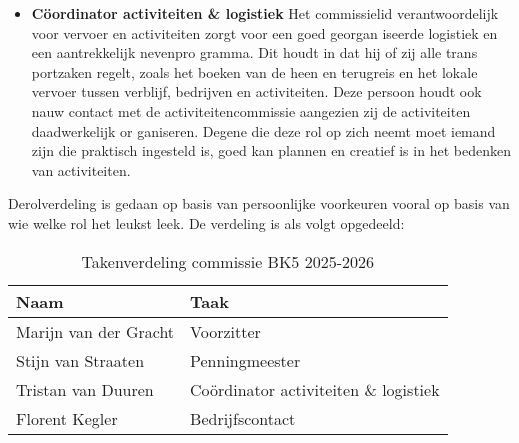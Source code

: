 \begin{itemize}
	\vspace{1cm}
	
	\item \textbf{Cöordinator activiteiten \& logistiek} Het commissielid verantwoordelijk voor vervoer
	en activiteiten zorgt voor een goed georgan
	iseerde logistiek en een aantrekkelijk nevenpro
	gramma. Dit houdt in dat hij of zij alle trans
	portzaken regelt, zoals het boeken van de heen
	en terugreis en het lokale vervoer tussen verblijf,
	bedrijven en activiteiten. Deze persoon houdt
	ook nauw contact met de activiteitencommissie
	aangezien zij de activiteiten daadwerkelijk or
	ganiseren. Degene die deze rol op zich neemt
	moet iemand zijn die praktisch ingesteld is, goed
	kan plannen en creatief is in het bedenken van
	activiteiten.
\end{itemize}

Derolverdeling is gedaan op basis van persoonlijke
voorkeuren vooral op basis van wie welke rol het
leukst leek. De verdeling is als volgt opgedeeld:

\begin{table}[h!]
	\centering
	\caption{Takenverdeling commissie BK5 2025-2026}
	\label{tab:takenverdeling}
	\begin{tabular}{|l|l|}
		\hline
		\textbf{Naam} & \textbf{Taak} \\
		\hline
		Marijn van der Gracht & Voorzitter \\
		\hline
		Stijn van Straaten & Penningmeester \\
		\hline
		Tristan van Duuren & Coördinator activiteiten \& logistiek \\
		\hline
		Florent Kegler & Bedrijfscontact \\
		\hline
	\end{tabular}
\end{table}